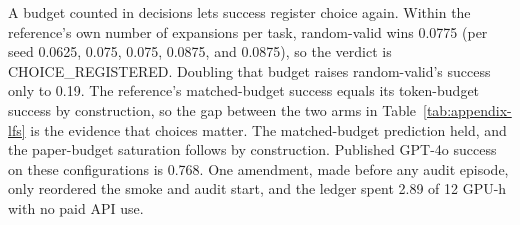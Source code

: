 A budget counted in decisions lets success register choice again. Within the reference's own number of expansions per task, random-valid wins 0.0775 (per seed 0.0625, 0.075, 0.075, 0.0875, and 0.0875), so the verdict is CHOICE\_REGISTERED. Doubling that budget raises random-valid's success only to 0.19. The reference's matched-budget success equals its token-budget success by construction, so the gap between the two arms in Table~\ref{tab:appendix-lfs} is the evidence that choices matter. The matched-budget prediction held, and the paper-budget saturation follows by construction. Published GPT-4o success on these configurations is 0.768. One amendment, made before any audit episode, only reordered the smoke and audit start, and the ledger spent 2.89 of 12 GPU-h with no paid API use.

